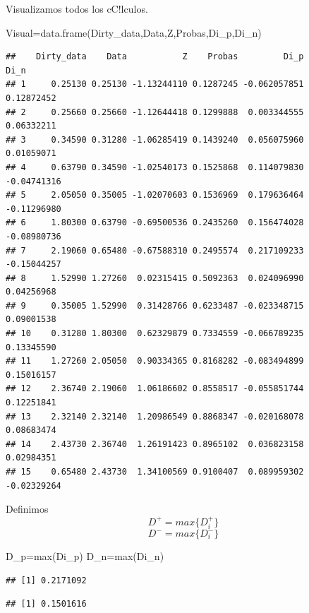 \documentclass[
]{article}
\newenvironment{Shaded}{\begin{snugshade}}{\end{snugshade}}
\newcommand{\FunctionTok}[1]{\textcolor[rgb]{0.00,0.00,0.00}{#1}}
\newcommand{\NormalTok}[1]{#1}
\newcommand{\OtherTok}[1]{\textcolor[rgb]{0.56,0.35,0.01}{#1}}
\begin{document}
Visualizamos todos los cC!lculos.

\begin{Shaded}
\begin{Highlighting}[]
\NormalTok{Visual}\OtherTok{=}\FunctionTok{data.frame}\NormalTok{(Dirty\_data,Data,Z,Probas,Di\_p,Di\_n)}
\end{Highlighting}
\end{Shaded}

\begin{verbatim}
##    Dirty_data    Data           Z    Probas         Di_p        Di_n
## 1     0.25130 0.25130 -1.13244110 0.1287245 -0.062057851  0.12872452
## 2     0.25660 0.25660 -1.12644418 0.1299888  0.003344555  0.06332211
## 3     0.34590 0.31280 -1.06285419 0.1439240  0.056075960  0.01059071
## 4     0.63790 0.34590 -1.02540173 0.1525868  0.114079830 -0.04741316
## 5     2.05050 0.35005 -1.02070603 0.1536969  0.179636464 -0.11296980
## 6     1.80300 0.63790 -0.69500536 0.2435260  0.156474028 -0.08980736
## 7     2.19060 0.65480 -0.67588310 0.2495574  0.217109233 -0.15044257
## 8     1.52990 1.27260  0.02315415 0.5092363  0.024096990  0.04256968
## 9     0.35005 1.52990  0.31428766 0.6233487 -0.023348715  0.09001538
## 10    0.31280 1.80300  0.62329879 0.7334559 -0.066789235  0.13345590
## 11    1.27260 2.05050  0.90334365 0.8168282 -0.083494899  0.15016157
## 12    2.36740 2.19060  1.06186602 0.8558517 -0.055851744  0.12251841
## 13    2.32140 2.32140  1.20986549 0.8868347 -0.020168078  0.08683474
## 14    2.43730 2.36740  1.26191423 0.8965102  0.036823158  0.02984351
## 15    0.65480 2.43730  1.34100569 0.9100407  0.089959302 -0.02329264
\end{verbatim}

Definimos \[D^{+}= max\{D_{i}^{+}\}\] \[D^{-}= max\{D_{i}^{-}\}\]

\begin{Shaded}
\begin{Highlighting}[]
\NormalTok{D\_p}\OtherTok{=}\FunctionTok{max}\NormalTok{(Di\_p)}
\NormalTok{D\_n}\OtherTok{=}\FunctionTok{max}\NormalTok{(Di\_n)}
\end{Highlighting}
\end{Shaded}

\begin{verbatim}
## [1] 0.2171092
\end{verbatim}

\begin{verbatim}
## [1] 0.1501616
\end{verbatim}
\end{document}
